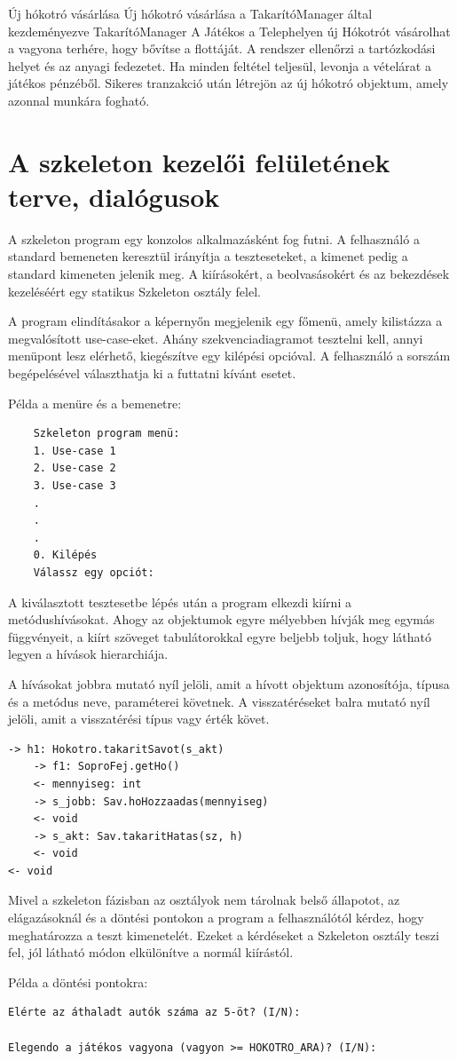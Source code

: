 \begin{use-case}
    {Új hókotró vásárlása}
    {Új hókotró vásárlása a TakarítóManager által kezdeményezve}
    {TakarítóManager}
    A Játékos a Telephelyen új Hókotrót vásárolhat a vagyona terhére, hogy bővítse a flottáját. A rendszer ellenőrzi a tartózkodási helyet és az anyagi fedezetet. Ha minden feltétel teljesül, levonja a vételárat a játékos pénzéből. Sikeres tranzakció után létrejön az új hókotró objektum, amely azonnal munkára fogható.
\end{use-case}

\section{A szkeleton kezelői felületének terve, dialógusok}
\par{A szkeleton program egy konzolos alkalmazásként fog futni. A felhasználó a standard bemeneten keresztül irányítja a teszteseteket, a kimenet pedig a standard kimeneten jelenik meg. A kiírásokért, a beolvasásokért és az bekezdések kezeléséért egy statikus Szkeleton osztály felel.}
\par{A program elindításakor a képernyőn megjelenik egy főmenü, amely kilistázza a megvalósított use-case-eket. Ahány szekvenciadiagramot tesztelni kell, annyi menüpont lesz elérhető, kiegészítve egy kilépési opcióval. A felhasználó a sorszám begépelésével választhatja ki a futtatni kívánt esetet.}
\par{Példa a menüre és a bemenetre:}
\begin{verbatim}
    Szkeleton program menü:
    1. Use-case 1
    2. Use-case 2
    3. Use-case 3
    .
    .
    .
    0. Kilépés
    Válassz egy opciót: 
\end{verbatim}
\par{A kiválasztott tesztesetbe lépés után a program elkezdi kiírni a metódushívásokat. Ahogy az objektumok egyre mélyebben hívják meg egymás függvényeit, a kiírt szöveget tabulátorokkal egyre beljebb toljuk, hogy látható legyen a hívások hierarchiája.}
\par{A hívásokat jobbra mutató nyíl jelöli, amit a hívott objektum azonosítója, típusa és a metódus neve, paraméterei követnek. A visszatéréseket balra mutató nyíl jelöli, amit a visszatérési típus vagy érték követ.}
\begin{verbatim}
-> h1: Hokotro.takaritSavot(s_akt)
    -> f1: SoproFej.getHo()
    <- mennyiseg: int
    -> s_jobb: Sav.hoHozzaadas(mennyiseg)
    <- void
    -> s_akt: Sav.takaritHatas(sz, h)
    <- void
<- void
\end{verbatim}
\par{Mivel a szkeleton fázisban az osztályok nem tárolnak belső állapotot, az elágazásoknál és a döntési pontokon a program a felhasználótól kérdez, hogy meghatározza a teszt kimenetelét. Ezeket a kérdéseket a Szkeleton osztály teszi fel, jól látható módon elkülönítve a normál kiírástól.}
\par{Példa a döntési pontokra:}
\begin{verbatim}
Elérte az áthaladt autók száma az 5-öt? (I/N):

Elegendo a játékos vagyona (vagyon >= HOKOTRO_ARA)? (I/N):
\end{verbatim}

